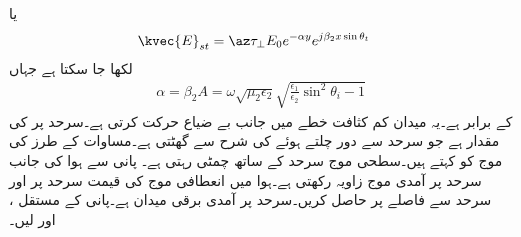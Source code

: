 یا
\begin{align}\label{مساوات_ترچھی_سطحی_موج}
\kvec{E}_{st} &=\az \tau_{\perp} E_0 e^{-\alpha y}e^{j \beta_2 x \sin \theta_t}
\end{align}
لکھا جا سکتا ہے جہاں
\begin{align}
\alpha=\beta_2 A =\omega \sqrt{\mu_2 \epsilon_2} \sqrt{\frac{\epsilon_1}{\epsilon_2}\sin^2 \theta_i -1}
\end{align}
کے برابر ہے۔یہ میدان کم کثافت خطے میں  جانب بے ضیاع حرکت کرتی ہے۔سرحد پر  کی مقدار  ہے جو سرحد سے دور چلتے ہوئے  کی شرح سے گھٹتی ہے۔مساوات  کے طرز کی موج کو  کہتے ہیں۔سطحی موج سرحد کے ساتھ چمٹی رہتی ہے۔ 
پانی سے ہوا کی جانب سرحد پر آمدی موج  زاویہ رکھتی ہے۔ہوا میں انعطافی موج کی قیمت سرحد پر اور سرحد سے  فاصلے پر حاصل کریں۔سرحد پر آمدی برقی میدان  ہے۔پانی کے مستقل ،  اور  لیں۔ 

